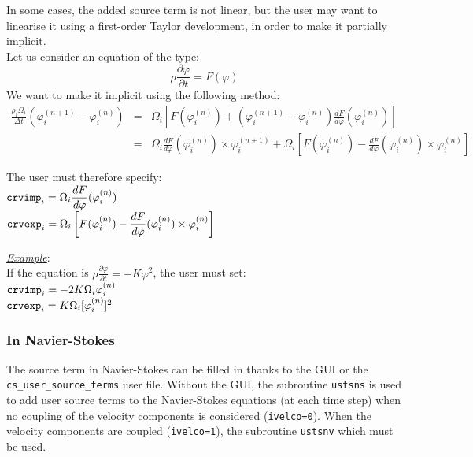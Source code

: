 {{{

In some cases, the added source term is not linear, but the user may
want to linearise it using a first-order Taylor development, in order to
make it partially implicit.\\
Let us consider an equation of the type:
\begin{displaymath}
\rho\frac{\partial\varphi}{\partial t}=F(\varphi)
\end{displaymath}
We want to make it implicit using the following method:
\begin{eqnarray*}
\frac{\rho_i\Omega_i}{\Delta t}\left(\varphi_i^{(n+1)}-\varphi_i^{(n)}\right) & = &
\Omega_i\left[F(\varphi_i^{(n)})+\left(\varphi_i^{(n+1)}-\varphi_i^{(n)}\right)
\frac{dF}{d\varphi}(\varphi_i^{(n)})\right]\\
& = & \Omega_i\frac{dF}{d\varphi}(\varphi_i^{(n)})\times\varphi_i^{(n+1)}
+\Omega_i\left[F(\varphi_i^{(n)})-\frac{dF}{d\varphi}(\varphi_i^{(n)})
\times\varphi_i^{(n)}\right]
\end{eqnarray*}

The user must therefore specify:\\
$\displaystyle\text{\texttt{crvimp}}_i=\Omega_i\frac{dF}{d\varphi}(\varphi_i^{(n)})$\\
$\displaystyle\text{\texttt{crvexp}}_i=
\Omega_i\left[F(\varphi_i^{(n)})-\frac{dF}{d\varphi}(\varphi_i^{(n)})\times\varphi_i^{(n)}\right]$

\underline{\em Example}:\\
If the equation is
$\displaystyle \rho\frac{\partial\varphi}{\partial t}=-K\varphi^2$,
the user must set:\\
$\text{\texttt{crvimp}}_i=-2K\Omega_i\varphi_i^{(n)}$\\
$\text{\texttt{crvexp}}_i=K\Omega_i[\varphi_i^{(n)}]^2$

\subsubsection{In Navier-Stokes}

The source term in Navier-Stokes can be filled in thanks to the GUI or the
\texttt{cs\_user\_source\_terms} user file.
Without the GUI, the subroutine \texttt{ustsns} is used to 
add user source terms to the Navier-Stokes equations (at each time step) when no coupling
 of the velocity components is considered (\texttt{ivelco=0}).
When the velocity components are coupled (\texttt{ivelco=1}), the subroutine \texttt{ustsnv}
which must be used.
 
}}}
